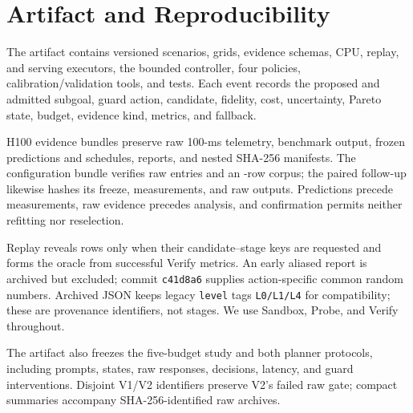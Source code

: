 \section{Artifact and Reproducibility}

The artifact contains versioned scenarios, grids, evidence schemas, CPU,
replay, and serving executors, the bounded controller, four policies,
calibration/validation tools, and \AutomatedTests{} tests.  Each event records
the proposed and admitted subgoal, guard action, candidate, fidelity, cost,
uncertainty, Pareto state, budget, evidence kind, metrics, and fallback.

H100 evidence bundles preserve raw 100-ms telemetry, benchmark output, frozen
predictions and schedules, reports, and nested SHA-256 manifests.  The
configuration bundle verifies \ConfigurationRawArtifacts{} raw entries and an
\ConfigurationReplayRows{}-row corpus; the paired follow-up likewise hashes its
freeze, \WinnerConfirmationRuns{} measurements, and raw outputs.  Predictions
precede measurements, raw evidence precedes analysis, and confirmation permits
neither refitting nor reselection.

Replay reveals rows only when their candidate--stage keys are requested and
forms the oracle from successful Verify metrics.  An early aliased report is
archived but excluded; commit \texttt{c41d8a6} supplies action-specific common
random numbers.  Archived JSON keeps legacy \texttt{level} tags
\texttt{L0/L1/L4} for compatibility; these are provenance identifiers, not
stages.  We use Sandbox, Probe, and Verify throughout.

The artifact also freezes the five-budget study and both planner protocols,
including prompts, states, raw responses, decisions, latency, and guard
interventions.  Disjoint V1/V2 identifiers preserve V2's failed raw gate;
compact summaries accompany SHA-256-identified raw archives.
